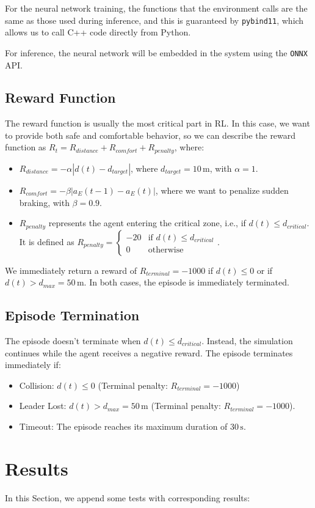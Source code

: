 For the neural network training, the functions that the environment calls are the same as those used during inference, and this is guaranteed by \texttt{pybind11}, which allows us to call C++ code directly from Python.

For inference, the neural network will be embedded in the system using the \texttt{ONNX} API.

\subsection{Reward Function}
The reward function is usually the most critical part in RL. In this case, we want to provide both safe and comfortable behavior, so we can describe the reward function as $R_t=R_{distance}+R_{comfort}+R_{penalty}$, where:
\begin{itemize}
    \item $R_{distance}=-\alpha|d(t)-d_{target}|$, where $d_{target}=10\,\text{m}$, with $\alpha = 1$.
    \item $R_{comfort}=-\beta |a_E(t-1)-a_E(t)|$, where we want to penalize sudden braking, with $\beta = 0.9$.
    \item $R_{penalty}$ represents the agent entering the critical zone, i.e., if $d(t) \le d_{critical}$. It is defined as $R_{penalty} = \begin{cases} -20 & \text{if } d(t) \le d_{critical} \\ 0 & \text{otherwise} \end{cases}$.
\end{itemize}
We immediately return a reward of $R_{terminal}=-1000$ if $d(t)\le0$ or if $d(t)>d_{max}=50\,\text{m}$. In both cases, the episode is immediately terminated.

\subsection{Episode Termination}
The episode doesn't terminate when $d(t) \le d_{critical}$. Instead, the simulation continues while the agent receives a negative reward. The episode terminates immediately if:
\begin{itemize}
    \item Collision: $d(t) \le 0$ (Terminal penalty: $R_{terminal} = -1000$)
    \item Leader Lost: $d(t) > d_{max} = 50\,\text{m}$ (Terminal penalty: $R_{terminal} = -1000$).
    \item Timeout: The episode reaches its maximum duration of $30\,\text{s}$.
\end{itemize}

\section{Results}
In this Section, we append some tests with corresponding results:



